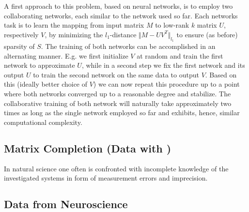 A first approach to this problem, based on neural networks, is to employ two collaborating networks, each similar to the network used so far. Each networks task is to learn the mapping from input matrix $M$ to low-rank $k$ matrix $U$, respectively $V$, by minimizing the $l_1$-distance $\Vert M- UV^T\Vert_{l_1}$ to ensure (as before) sparsity of $S$. The training of both networks can be accomplished in an alternating manner. E.g. we first initialize $V$ at random and train the first network to approximate $U$, while in a second step we fix the first network and its output $U$ to train the second network on the same data to output $V$. Based on this (ideally better choice of $V$) we can now repeat this procedure up to a point where both networks converged up to a reasonable degree and stabilize. The collaborative training of both network will naturally take approximately two times as long as the single network employed so far and exhibits, hence, similar computational complexity. 


\subsection{Matrix Completion (Data with )}
In natural science one often is confronted with incomplete knowledge of the investigated systems in form of measurement errors and imprecision.

\subsection{Data from Neuroscience}
